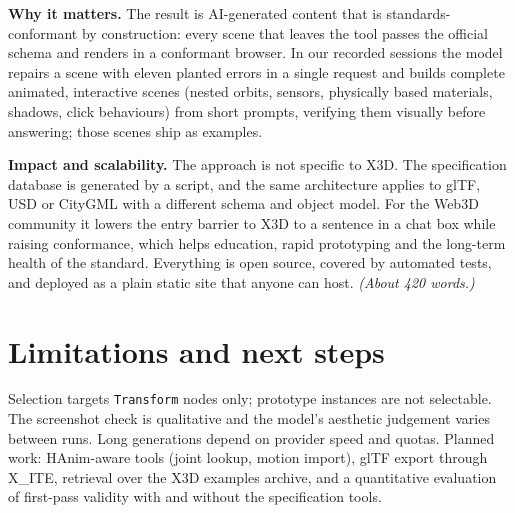 \documentclass[10pt,a4paper]{article}
\begin{document}
\textbf{Why it matters.} The result is AI-generated content that is standards-conformant by construction: every scene that leaves the tool passes the official schema and renders in a conformant browser. In our recorded sessions the model repairs a scene with eleven planted errors in a single request and builds complete animated, interactive scenes (nested orbits, sensors, physically based materials, shadows, click behaviours) from short prompts, verifying them visually before answering; those scenes ship as examples.

\textbf{Impact and scalability.} The approach is not specific to X3D. The specification database is generated by a script, and the same architecture applies to glTF, USD or CityGML with a different schema and object model. For the Web3D community it lowers the entry barrier to X3D to a sentence in a chat box while raising conformance, which helps education, rapid prototyping and the long-term health of the standard. Everything is open source, covered by automated tests, and deployed as a plain static site that anyone can host. \emph{(About 420 words.)}

\section{Limitations and next steps}
Selection targets \texttt{Transform} nodes only; prototype instances are not selectable. The screenshot check is qualitative and the model's aesthetic judgement varies between runs. Long generations depend on provider speed and quotas. Planned work: HAnim-aware tools (joint lookup, motion import), glTF export through X\_ITE, retrieval over the X3D examples archive, and a quantitative evaluation of first-pass validity with and without the specification tools.
\end{document}
